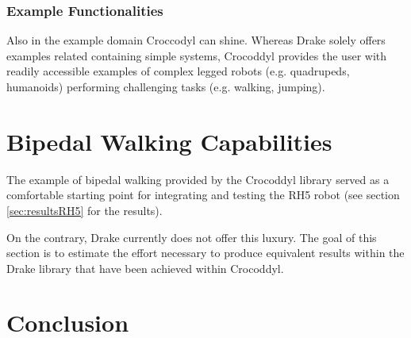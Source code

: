 \subsubsection{Example Functionalities}
Also in the example domain Croccodyl can shine. Whereas Drake  solely offers examples related containing simple systems, Crocoddyl provides the user with readily accessible examples of complex legged robots (e.g. quadrupeds, humanoids) performing challenging tasks (e.g. walking, jumping).


\section{Bipedal Walking Capabilities}
The example of bipedal walking provided by the Crocoddyl library served as a comfortable starting point for integrating and testing the RH5  robot (see section \ref{sec:resultsRH5} for the results).

On the contrary, Drake currently does not offer this luxury. The goal of this section is to estimate the effort necessary to produce equivalent results within the Drake library that have been achieved within Crocoddyl.


\section{Conclusion}







